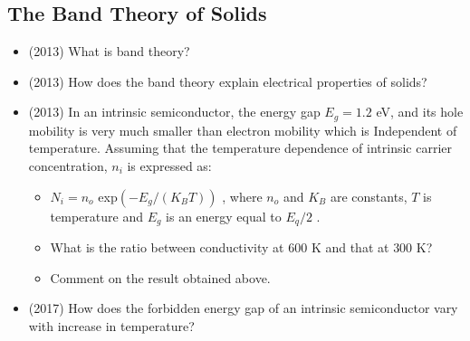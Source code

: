 \documentclass{article}
\begin{document}
\subsection{The Band Theory of Solids}
\begin{itemize}
\item (2013)  What is band theory?
\item (2013)  How does the band theory explain electrical properties of solids?
\item (2013)  In an intrinsic semiconductor, the energy gap $ E_{g}=1.2$ eV, and its hole mobility is very much smaller than electron mobility which is Independent of temperature. Assuming that the temperature dependence of intrinsic carrier concentration, $ n_{i}$ is expressed as:\begin{itemize}
\item $ N_{i}=n_{o}$ exp$ (-E_{g}/(K_{B}T))$ , where $ n_{o}$ and $ K_{B}$ are constants, $ T$ is temperature and $ E_{g}$ is an energy equal to $ E_{q}/2$ .  
\item What is the ratio between conductivity at $ 600$ K and that at $ 300$ K?
\item Comment on the result obtained above.
\end{itemize}
\item (2017)  How does the forbidden energy gap of an intrinsic semiconductor vary with increase in temperature? 
\end{itemize}
\end{document}
